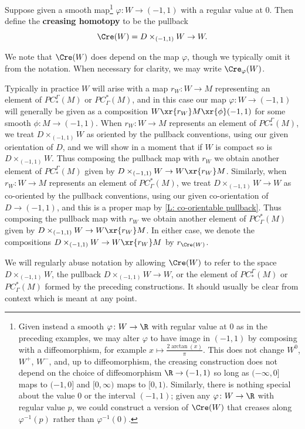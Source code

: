 \begin{definition}
	Suppose given a smooth map\footnote{Given instead a smooth $\varphi \colon W \to \R$ with regular value at $0$ as in the preceding examples, we may alter $\varphi$ to have image in $(-1,1)$ by composing with a diffeomorphism, for example $x \mapsto \frac{2\arctan(x)}{\pi}$.
	This does not change $W^0$, $W^+$, $W^-$, and, up to diffeomorphism, the creasing construction does not depend on the choice of diffeomorphism $\R \to (-1,1)$ so long as $(-\infty,0]$ maps to $(-1,0]$ and $[0,\infty)$ maps to $[0,1)$.
	Similarly, there is nothing special about the value $0$ or the interval $(-1,1)$; given any $\varphi \colon W \to \R$ with regular value $p$, we could construct a version of $\Cre(W)$ that creases along $\varphi^{-1}(p)$ rather than $\varphi^{-1}(0)$.}
	$\varphi \colon W \to (-1,1)$ with a regular value at $0$.
	Then define the \textbf{creasing homotopy} to be the pullback
	$$\Cre(W) = D\times_{(-1,1)} W \to W.$$

	We note that $\Cre(W)$ does depend on the map $\varphi$, though we typically omit it from the notation.
	When necessary for clarity, we may write $\Cre_\varphi(W)$.

	Typically in practice $W$ will arise with a map $r_W \colon W \to M$ representing an element of $PC_*^\Gamma(M)$ or $PC^*_\Gamma(M)$, and in this case our map $\varphi \colon W \to (-1,1)$ will generally be given as a composition
	$W \xr{r_W}M \xr{\phi} (-1,1)$ for some smooth $\phi \colon M \to (-1,1)$.
	When $r_W \colon W \to M$ represents an element of $PC_*^\Gamma(M)$, we treat $D\times_{(-1,1)} W$ as oriented by the pullback conventions, using our given orientation of $D$, and we will show in a moment that if $W$ is compact so is $D\times_{(-1,1)} W$.
	Thus composing the pullback map with $r_W$ we obtain another element of $PC_*^\Gamma(M)$ given by $D\times_{(-1,1)} W \to W \xr{r_W}M$.
	Similarly, when $r_W \colon W \to M$ represents an element of $PC^*_\Gamma(M)$, we treat $D\times_{(-1,1)} W \to W$ as co-oriented by the pullback conventions, using our given co-orientation of $D \to (-1,1)$, and this is a proper map by \cref{L: co-orientable pullback}.
	Thus composing the pullback map with $r_W$ we obtain another element of $PC^*_\Gamma(M)$ given by $D\times_{(-1,1)} W \to W \xr{r_W}M$.
	In either case, we denote the compositions $D\times_{(-1,1)} W \to W \xr{r_W}M$ by $r_{\Cre(W)}$.

	We will regularly abuse notation by allowing $\Cre(W)$ to refer to the space $D\times_{(-1,1)} W$, the pullback $D\times_{(-1,1)} W \to W$, or the element of $PC_*^\Gamma(M)$ or $PC^*_\Gamma(M)$ formed by the preceding constructions.
	It should usually be clear from context which is meant at any point.
\end{definition}

